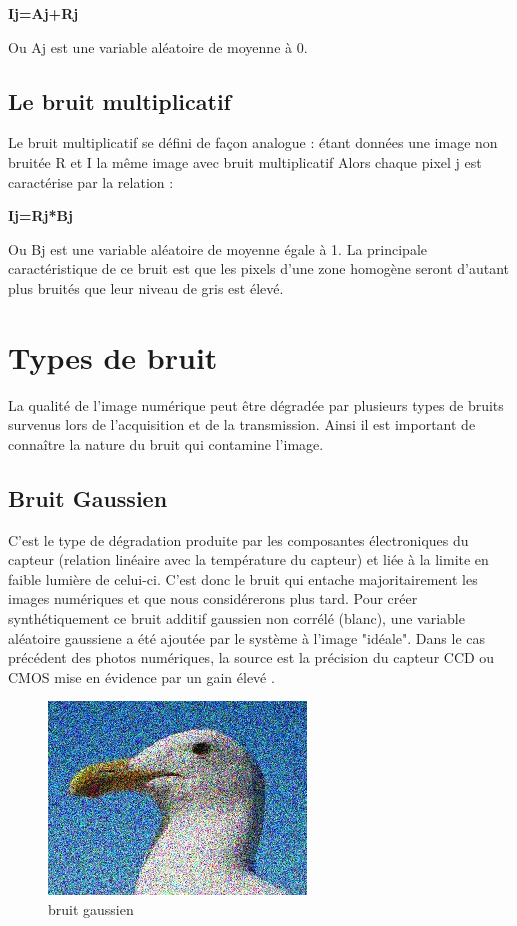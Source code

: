 \documentclass[12pt,a4paper]{report}
\numberwithin{equation}{subsection}
\numberwithin{equation}{section}
\begin{document}
\begin{center}
    {\bfseries Ij=Aj+Rj}
\end{center}
\newline
\newline
 Ou Aj est une variable aléatoire de moyenne à 0.

\subsection{Le bruit multiplicatif}
Le bruit multiplicatif se défini de façon analogue : étant données une image non bruitée R et I la même image avec bruit multiplicatif Alors chaque pixel j est caractérise par la relation :\begin{center}
    {\bfseries Ij=Rj*Bj}
\end{center}
\newline
\newline Ou Bj est une variable aléatoire de moyenne égale à 1. La principale caractéristique de ce bruit est que les pixels d’une zone homogène seront d’autant plus bruités que leur niveau de gris est élevé.
\newpage
\section{Types de bruit}
La qualité de l’image numérique peut être dégradée par plusieurs types de bruits
survenus lors de l’acquisition et de la transmission. Ainsi il est important de connaître la
nature du bruit qui contamine l’image.
\newline
\subsection{Bruit Gaussien}
C’est le type de dégradation produite par les composantes électroniques du capteur
(relation linéaire avec la température du capteur) et liée à la limite en faible lumière de
celui-ci. C’est donc le bruit qui entache majoritairement les images numériques et que
nous considérerons plus tard.\newline
Pour créer synthétiquement ce bruit additif gaussien non corrélé (blanc), une variable
aléatoire gaussiene a été ajoutée par le système à l’image "idéale". Dans le cas précédent
des photos numériques, la source est la précision du capteur CCD ou CMOS mise en évidence par un gain élevé .
\begin{figure}[h!]
    \centering
    \includegraphics[width=.3\textwidth]{bruit_gaussien.jpg}
     \caption{bruit gaussien}
\end{figure}
\newline
\end{document}
